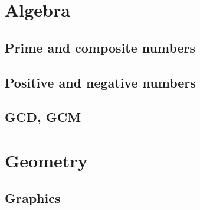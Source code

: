 \documentclass[a4paper]{article}
\begin{document}
\begin{multicols}{2}
		{\Large \section {Algebra}}

		\subsection{Prime and composite numbers}
		\subsection{Positive and negative numbers}
		\subsection{GCD, GCM}

		{\Large \section {Geometry}}

		\subsection{Graphics}


	\end{multicols}








		
\end{document}
